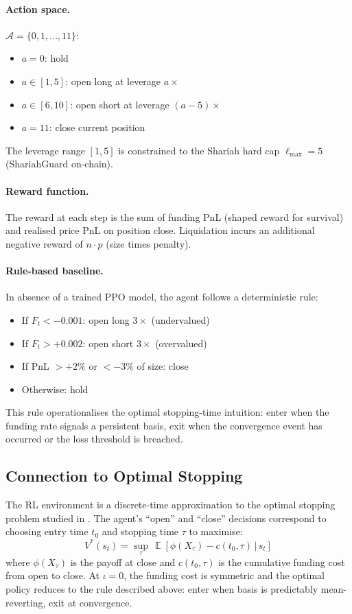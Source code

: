 \documentclass[10pt,twocolumn]{article}
\theoremstyle{plain}
\theoremstyle{definition}
\DeclareMathOperator{\E}{\mathbb{E}}
\begin{document}
\paragraph{Action space.}  $\mathcal{A} = \{0,1,\ldots,11\}$:
\begin{itemize}[leftmargin=*,noitemsep]
\item $a=0$: hold
\item $a \in [1,5]$: open long at leverage $a \times$
\item $a \in [6,10]$: open short at leverage $(a-5)\times$
\item $a=11$: close current position
\end{itemize}
The leverage range $[1,5]$ is constrained to the Shariah
hard cap $\ell_{\max}=5$ (ShariahGuard on-chain).

\paragraph{Reward function.}  The reward at each step is
the sum of funding PnL (shaped reward for survival) and
realised price PnL on position close.  Liquidation incurs
an additional negative reward of $n \cdot p$ (size times
penalty).

\paragraph{Rule-based baseline.}  In absence of a trained PPO
model, the agent follows a deterministic rule:
\begin{itemize}[leftmargin=*,noitemsep]
\item If $F_t < -0.001$: open long $3\times$ (undervalued)
\item If $F_t > +0.002$: open short $3\times$ (overvalued)
\item If PnL $> +2\%$ or $< -3\%$ of size: close
\item Otherwise: hold
\end{itemize}
This rule operationalises the optimal stopping-time
intuition: enter when the funding rate signals a persistent
basis, exit when the convergence event has occurred or
the loss threshold is breached.

\subsection{Connection to Optimal Stopping}

The RL environment is a discrete-time approximation to the
optimal stopping problem studied in \cite{Ackerer2024}.
The agent's ``open'' and ``close'' decisions correspond to
choosing entry time $t_0$ and stopping time $\tau$ to
maximise:
\begin{equation}
  V^*(s_t) = \sup_\tau\,
    \E\!\left[\phi(X_\tau) - c(t_0, \tau)\,\Big|\,s_t\right]
  \label{eq:rl_stopping}
\end{equation}
where $\phi(X_\tau)$ is the payoff at close and
$c(t_0, \tau)$ is the cumulative funding cost from
open to close.  At $\iota=0$, the funding cost is
symmetric and the optimal policy reduces to the
rule described above: enter when basis is predictably
mean-reverting, exit at convergence.
\end{document}
